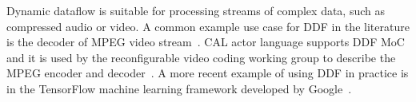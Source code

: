 Dynamic dataflow is suitable for processing streams of complex data, such as compressed audio or video. A common example use case for DDF in the literature is the decoder of MPEG video stream~\cite{bhattacharyya2013handbook}. CAL actor language supports DDF MoC and it is used by the reconfigurable video coding working group to describe the MPEG encoder and decoder~\cite{bhattacharyya2011overview}. A more recent example of using DDF in practice is in the TensorFlow machine learning framework developed by Google~\cite{tensorflow2015-whitepaper}.
